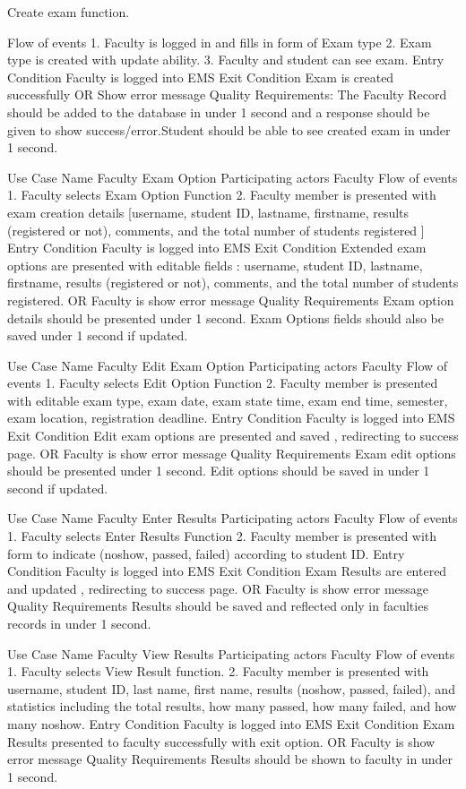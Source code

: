 Create exam function.

Flow of events	
1. Faculty is logged in and fills in form of Exam type
2. Exam type is created with update ability.
3. Faculty and student can see exam.
Entry Condition	Faculty is logged into EMS
Exit Condition	Exam is created successfully
OR 
Show error message
Quality Requirements:	The Faculty Record should be added to the database in under 1 second and a response should be given to show success/error.Student should be able to see created exam in under 1 second.
	
	
Use Case Name	Faculty Exam Option
Participating actors	 Faculty
Flow of events	
1. Faculty selects Exam Option Function
2. Faculty member is presented with exam creation details [username, student ID, lastname, firstname, results (registered or not), comments, and the total number of students registered ]
Entry Condition	Faculty is logged into EMS
Exit Condition	Extended exam options are presented with editable fields : username, student ID, lastname, firstname, results (registered or not), comments, and the total number of students registered.
OR
Faculty is show error message 
Quality Requirements	Exam option details should be presented under 1 second. Exam Options fields should also be saved under 1 second if updated.
	
Use Case Name	Faculty Edit Exam Option
Participating actors	 Faculty
Flow of events	
1. Faculty selects Edit Option Function
2. Faculty member is presented with editable exam type, exam date, exam state time, exam end time, semester, exam location, registration deadline. 
Entry Condition	Faculty is logged into EMS
Exit Condition	Edit exam options are presented and saved  , redirecting to success page.
OR
Faculty is show error message 
Quality Requirements	Exam edit options should be presented under 1 second. Edit options should be saved in under 1 second if updated.
	
	
Use Case Name	Faculty Enter Results
Participating actors	 Faculty
Flow of events	
1. Faculty selects Enter Results Function
2. Faculty member is presented with form to indicate (noshow, passed, failed) according to student ID. 
Entry Condition	Faculty is logged into EMS
Exit Condition	Exam Results are entered and updated , redirecting to success page.
OR
Faculty is show error message 
Quality Requirements	Results should be saved and reflected only in faculties records in under 1 second.
	
Use Case Name	Faculty View Results
Participating actors	 Faculty
Flow of events	
1. Faculty selects View Result function.
2. Faculty member is presented with username, student ID, last name, first name, results (noshow, passed, failed), and statistics including the total results, how many passed, how many failed, and how many noshow. 
Entry Condition	Faculty is logged into EMS
Exit Condition	Exam Results presented to faculty successfully with exit option.
OR
Faculty is show error message 
Quality Requirements	Results should be shown to faculty in under 1 second.
	
